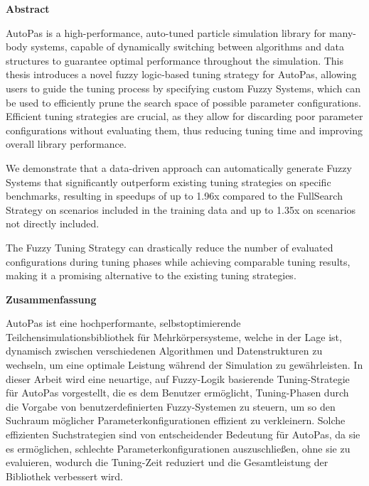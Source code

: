 {}
\vspace*{2cm}
\begin{center}
    {\Large \textbf{Abstract}}
\end{center}
\vspace{1cm}

AutoPas is a high-performance, auto-tuned particle simulation library for many-body systems, capable of dynamically switching between algorithms and data structures to guarantee optimal performance throughout the simulation.
This thesis introduces a novel fuzzy logic-based tuning strategy for AutoPas, allowing users to guide the tuning process by specifying custom Fuzzy Systems, which can be used to efficiently prune the search space of possible parameter configurations. Efficient tuning strategies are crucial, as they allow for discarding poor parameter configurations without evaluating them, thus reducing tuning time and improving overall library performance.

\smallskip

We demonstrate that a data-driven approach can automatically generate Fuzzy Systems that significantly outperform existing tuning strategies on specific benchmarks, resulting in speedups of up to 1.96x compared to the FullSearch Strategy on scenarios included in the training data and up to 1.35x on scenarios not directly included.

\smallskip

The Fuzzy Tuning Strategy can drastically reduce the number of evaluated configurations during tuning phases while achieving comparable tuning results, making it a promising alternative to the existing tuning strategies.

\cleardoublepage

{}
\vspace*{2cm}
\begin{center}
    {\Large \textbf{Zusammenfassung}}
\end{center}
\vspace{1cm}

AutoPas ist eine hochperformante, selbstoptimierende Teilchensimulationsbibliothek für Mehrkörpersysteme, welche in der Lage ist, dynamisch zwischen verschiedenen Algorithmen und Datenstrukturen zu wechseln, um eine optimale Leistung während der Simulation zu gewährleisten.
In dieser Arbeit wird eine neuartige, auf Fuzzy-Logik basierende Tuning-Strategie für AutoPas vorgestellt, die es dem Benutzer ermöglicht, Tuning-Phasen durch die Vorgabe von benutzerdefinierten Fuzzy-Systemen zu steuern, um so den Suchraum möglicher Parameterkonfigurationen effizient zu verkleinern. Solche effizienten Suchstrategien sind von entscheidender Bedeutung für AutoPas, da sie es ermöglichen, schlechte Parameterkonfigurationen auszuschließen, ohne sie zu evaluieren, wodurch die Tuning-Zeit reduziert und die Gesamtleistung der Bibliothek verbessert wird.

